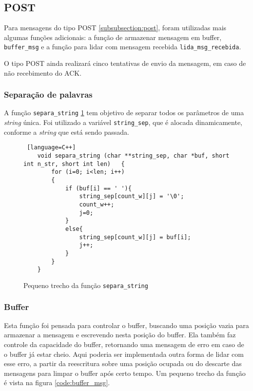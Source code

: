 \subsection{POST}

Para mensagens do tipo POST \ref{subsubsection:post}, foram utilizadas mais algumas funções adicionais: a  função de armazenar mensagem em buffer, \texttt{buffer\_msg} e a função para lidar com mensagem recebida \texttt{lida\_msg\_recebida}.

O tipo POST ainda realizará cinco tentativas de envio da mensagem, em caso de não recebimento do ACK.

\subsubsection{Separação de palavras}
A função \texttt{separa\_string} \ref{code:separa_string} tem objetivo de separar todos os parâmetros de uma \textit{string} única. Foi utilizado a variável \texttt{string\_sep}, que é alocada dinamicamente, conforme a \textit{string} que está sendo passada.

\begin{figure}[!htb]
	\begin{lstlisting} [language=C++]
	void separa_string (char **string_sep, char *buf, short int n_str, short int len)	{
		for (i=0; i<len; i++)
		{
			if (buf[i] == ' '){			
				string_sep[count_w][j] = '\0';
				count_w++;
				j=0;
			}
			else{
				string_sep[count_w][j] = buf[i];
				j++;
			}
		}
	}
	\end{lstlisting}
	\caption{Pequeno trecho da função \texttt{separa\_string}}
	\label{code:separa_string}
\end{figure}

\subsubsection{Buffer}

Esta função foi pensada para controlar o buffer, buscando uma posição vazia para armazenar a mensagem e escrevendo nesta posição do buffer. Ela também faz controle da capacidade do buffer, retornando uma mensagem de erro em caso de o buffer já estar cheio. Aqui poderia ser implementada outra forma de lidar com esse erro, a partir da reescritura sobre uma posição ocupada ou do descarte das mensagens para limpar o buffer após certo tempo. Um pequeno trecho da função é vista na figura \ref{code:buffer_msg}.

